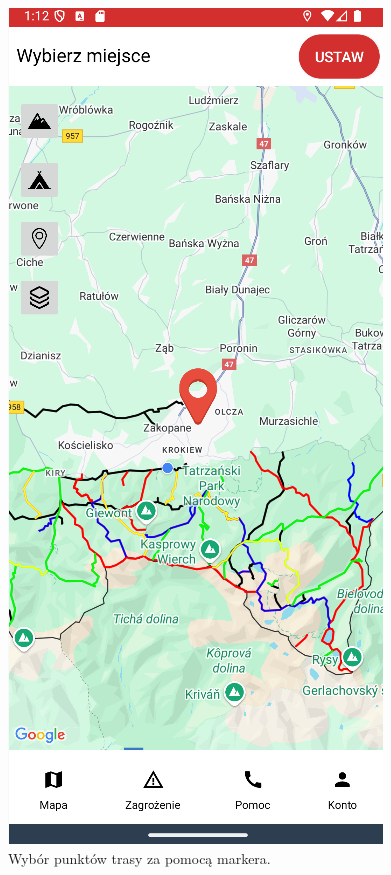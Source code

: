 \begin{figure}[H]
    \centering
    \includegraphics[scale=0.5]{img/imp/widok-marker.png}
    \caption{Wybór punktów trasy za pomocą markera.}
    \label{widok:ustawlokalizacje}
\end{figure}


